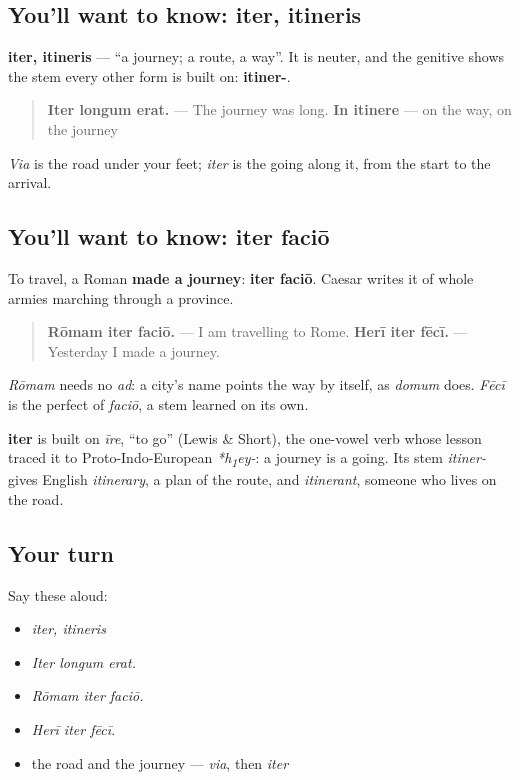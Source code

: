 \subsection*{You'll want to know: iter, itineris}
\textbf{iter, itineris} — \textquotedblleft{}a journey; a route, a way\textquotedblright{}. It is neuter, and the genitive shows the stem every other form is built on: \textbf{itiner-}.

\begin{quote}
\textbf{Iter longum erat.} — The journey was long. \textbf{In itinere} — on the way, on the journey
\end{quote}

\emph{Via} is the road under your feet; \emph{iter} is the going along it, from the start to the arrival.

\subsection*{You'll want to know: iter faciō}
To travel, a Roman \textbf{made a journey}: \textbf{iter faciō}. Caesar writes it of whole armies marching through a province.

\begin{quote}
\textbf{Rōmam iter faciō.} — I am travelling to Rome. \textbf{Herī iter fēcī.} — Yesterday I made a journey.
\end{quote}

\emph{Rōmam} needs no \emph{ad}: a city's name points the way by itself, as \emph{domum} does. \emph{Fēcī} is the perfect of \emph{faciō}, a stem learned on its own.

\begin{cousinweb}
\textbf{iter} is built on \emph{īre}, \textquotedblleft{}to go\textquotedblright{} (Lewis \& Short), the one-vowel verb whose lesson traced it to Proto-Indo-European \emph{*h\textsubscript{1}ey-}: a journey is a going. Its stem \emph{itiner-} gives English \emph{itinerary}, a plan of the route, and \emph{itinerant}, someone who lives on the road.
\end{cousinweb}

\subsection*{Your turn}
Say these aloud:

\begin{itemize}
\raggedright
  \item \emph{iter, itineris}
  \item \emph{Iter longum erat.}
  \item \emph{Rōmam iter faciō.}
  \item \emph{Herī iter fēcī.}
  \item the road and the journey — \emph{via}, then \emph{iter}
\end{itemize}

